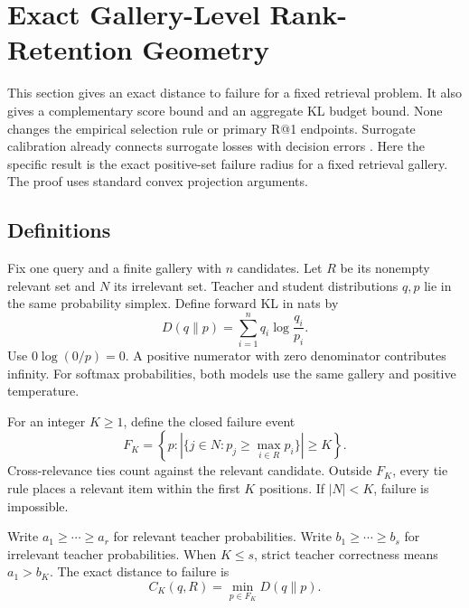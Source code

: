 \section{Exact Gallery-Level Rank-Retention Geometry}
\label{app:ranktheory}
This section gives an exact distance to failure for a fixed retrieval problem.
It also gives a complementary score bound and an aggregate KL budget bound.
None changes the empirical selection rule or primary R@1 endpoints.
Surrogate calibration already connects surrogate losses with decision errors \citep{bartlett2003risk,pires2016calibration}.
Here the specific result is the exact positive-set failure radius for a fixed retrieval gallery.
The proof uses standard convex projection arguments.

\subsection{Definitions}
Fix one query and a finite gallery with $n$ candidates.
Let $R$ be its nonempty relevant set and $N$ its irrelevant set.
Teacher and student distributions $q,p$ lie in the same probability simplex.
Define forward KL in nats by
\begin{equation}
D(q\|p)=\sum_{i=1}^n q_i\log\frac{q_i}{p_i}.
\end{equation}
Use $0\log(0/p)=0$.
A positive numerator with zero denominator contributes infinity.
For softmax probabilities, both models use the same gallery and positive temperature.

For an integer $K\geq1$, define the closed failure event
\begin{equation}
F_K=\left\{p:\left|\{j\in N:p_j\geq\max_{i\in R}p_i\}\right|\geq K\right\}.
\end{equation}
Cross-relevance ties count against the relevant candidate.
Outside $F_K$, every tie rule places a relevant item within the first $K$ positions.
If $|N|<K$, failure is impossible.

Write $a_1\geq\cdots\geq a_r$ for relevant teacher probabilities.
Write $b_1\geq\cdots\geq b_s$ for irrelevant teacher probabilities.
When $K\leq s$, strict teacher correctness means $a_1>b_K$.
The exact distance to failure is
\begin{equation}
C_K(q,R)=\min_{p\in F_K}D(q\|p).
\end{equation}

